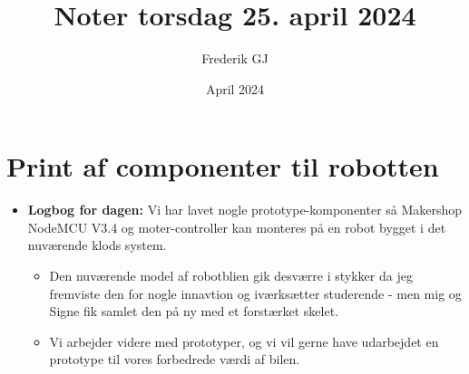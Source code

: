 \documentclass{article}
\title{Noter torsdag 25. april 2024}
\author{Frederik GJ}
\date{April 2024}
\begin{document}
\maketitle

\section{Print af componenter til robotten}

\begin{itemize}
    \item \textbf{Logbog for dagen:} Vi har lavet nogle prototype-komponenter så Makershop NodeMCU V3.4 og moter-controller kan monteres på en robot bygget i det nuværende klods system. 
    \begin{itemize}
        \item Den nuværende model af robotblien gik desværre i stykker da jeg fremviste den for nogle innavtion og iværksætter studerende - men mig og Signe fik samlet den på ny med et forstærket skelet. 
        \item Vi arbejder videre med prototyper, og vi vil gerne have udarbejdet en prototype til vores forbedrede værdi af bilen. 
    \end{itemize}
\end{itemize}
\end{document}
